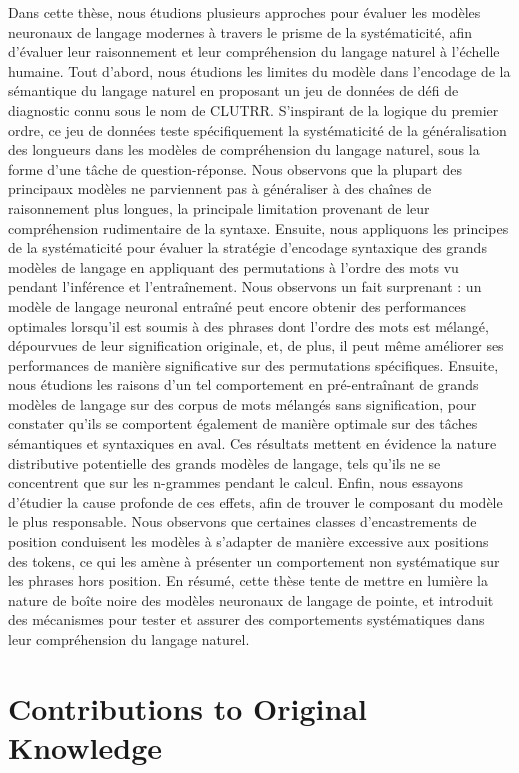 \documentclass[letterpaper, 12pt]{report}
\begin{document}
Dans cette thèse, nous étudions plusieurs approches pour évaluer les modèles neuronaux de langage modernes à travers le prisme de la systématicité, afin d'évaluer leur raisonnement et leur compréhension du langage naturel à l'échelle humaine. Tout d'abord, nous étudions les limites du modèle dans l'encodage de la sémantique du langage naturel en proposant un jeu de données de défi de diagnostic connu sous le nom de CLUTRR. S'inspirant de la logique du premier ordre, ce jeu de données teste spécifiquement la systématicité de la généralisation des longueurs dans les modèles de compréhension du langage naturel, sous la forme d'une tâche de question-réponse. Nous observons que la plupart des principaux modèles ne parviennent pas à généraliser à des chaînes de raisonnement plus longues, la principale limitation provenant de leur compréhension rudimentaire de la syntaxe. Ensuite, nous appliquons les principes de la systématicité pour évaluer la stratégie d'encodage syntaxique des grands modèles de langage en appliquant des permutations à l'ordre des mots vu pendant l'inférence et l'entraînement. Nous observons un fait surprenant : un modèle de langage neuronal entraîné peut encore obtenir des performances optimales lorsqu'il est soumis à des phrases dont l'ordre des mots est mélangé, dépourvues de leur signification originale, et, de plus, il peut même améliorer ses performances de manière significative sur des permutations spécifiques. Ensuite, nous étudions les raisons d'un tel comportement en pré-entraînant de grands modèles de langage sur des corpus de mots mélangés sans signification, pour constater qu'ils se comportent également de manière optimale sur des tâches sémantiques et syntaxiques en aval. Ces résultats mettent en évidence la nature distributive potentielle des grands modèles de langage, tels qu'ils ne se concentrent que sur les n-grammes pendant le calcul. Enfin, nous essayons d'étudier la cause profonde de ces effets, afin de trouver le composant du modèle le plus responsable. Nous observons que certaines classes d'encastrements de position conduisent les modèles à s'adapter de manière excessive aux positions des tokens, ce qui les amène à présenter un comportement non systématique sur les phrases hors position. En résumé, cette thèse tente de mettre en lumière la nature de boîte noire des modèles neuronaux de langage de pointe, et introduit des mécanismes pour tester et assurer des comportements systématiques dans leur compréhension du langage naturel.



\chapter*{Contributions to Original Knowledge}
\label{sec:orig_cont}
\end{document}
